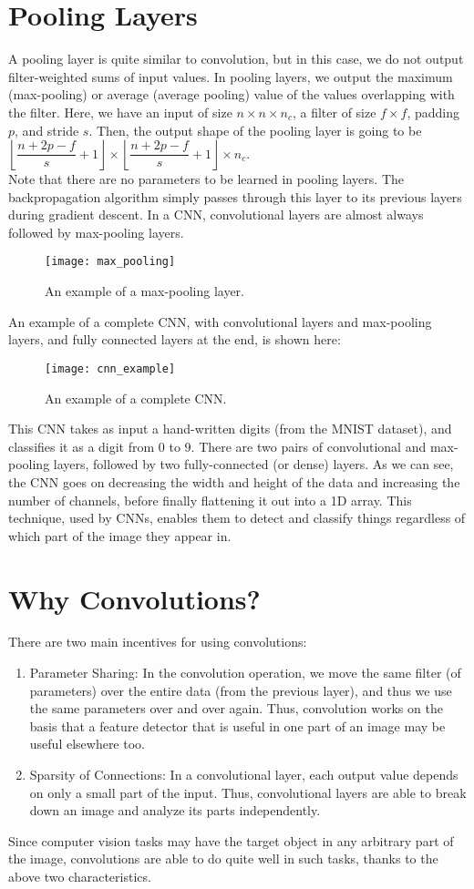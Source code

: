 \documentclass[a4paper, 12pt]{report}
\begin{document}
\section{Pooling Layers}
A pooling layer is quite similar to convolution, but in this case, we do not output filter-weighted sums of input values. In pooling layers, we output the maximum (max-pooling) or average (average pooling) value of the values overlapping with the filter. Here, we have an input of size $n\times n\times n_c$, a filter of size $f\times f$, padding $p$, and stride $s$. Then, the output shape of the pooling layer is going to be $\left\lfloor{\dfrac{n+2p-f}{s}+1}\right\rfloor \times \left\lfloor{\dfrac{n+2p-f}{s}+1}\right\rfloor \times n_c$.\\
\break
Note that there are no parameters to be learned in pooling layers. The backpropagation algorithm simply passes through this layer to its previous layers during gradient descent. In a CNN, convolutional layers are almost always followed by max-pooling layers.
\begin{figure}[H]
\centering
\texttt{[image: max\_pooling]}
\caption{An example of a max-pooling layer.}
\end{figure}
An example of a complete CNN, with convolutional layers and max-pooling layers, and fully connected layers at the end, is shown here:
\begin{figure}[H]
\centering
\texttt{[image: cnn\_example]}
\caption{An example of a complete CNN.}
\end{figure}
This CNN takes as input a hand-written digits (from the MNIST dataset), and classifies it as a digit from 0 to 9. There are two pairs of convolutional and max-pooling layers, followed by two fully-connected (or dense) layers. As we can see, the CNN goes on decreasing the width and height of the data and increasing the number of channels, before finally flattening it out into a 1D array. This technique, used by CNNs, enables them to detect and classify things regardless of which part of the image they appear in.

\section{Why Convolutions?}
There are two main incentives for using convolutions:
\begin{enumerate}
\item Parameter Sharing: In the convolution operation, we move the same filter (of parameters) over the entire data (from the previous layer), and thus we use the same parameters over and over again. Thus, convolution works on the basis that a feature detector that is useful in one part of an image may be useful elsewhere too.
\item Sparsity of Connections: In a convolutional layer, each output value depends on only a small part of the input. Thus, convolutional layers are able to break down an image and analyze its parts independently.
\end{enumerate}
Since computer vision tasks may have the target object in any arbitrary part of the image, convolutions are able to do quite well in such tasks, thanks to the above two characteristics.
\end{document}
